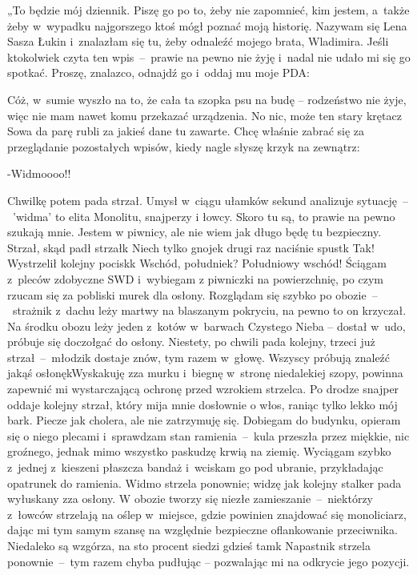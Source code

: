 \documentclass[../MAIN.tex]{subfiles}
\begin{document}
„To będzie mój dziennik. Piszę go po to, żeby nie zapomnieć,
kim jestem, a~także żeby w~wypadku najgorszego ktoś mógł poznać
moją historię. Nazywam się Lena Sasza Łukin i~znalazłam się tu,
żeby odnaleźć mojego brata, Wladimira. Jeśli ktokolwiek czyta
ten wpis~--~prawie na pewno nie żyję i~nadal nie udało mi się
go
spotkać. Proszę, znalazco, odnajdź go i~oddaj mu moje PDA:

Cóż, w~sumie wyszło na to, że cała ta szopka psu na budę –
rodzeństwo nie żyje, więc nie mam nawet komu przekazać
urządzenia. No nic, może ten stary krętacz Sowa da parę rubli
za jakieś dane tu zawarte. Chcę właśnie zabrać się za
przeglądanie pozostałych wpisów, kiedy nagle słyszę krzyk na
zewnątrz:

-Widmoooo!!

Chwilkę potem pada strzał. Umysł w~ciągu ułamków sekund
analizuje sytuację~--~'widma' to elita Monolitu, snajperzy i
łowcy. Skoro tu są, to prawie na pewno szukają mnie. Jestem w
piwnicy, ale nie wiem jak długo będę tu bezpieczny. Strzał,
skąd padł strzał\3k Niech tylko gnojek drugi raz naciśnie
spust\3k Tak! Wystrzelił kolejny pocisk\3k Wschód, południe\3k?
Południowy wschód! Ściągam z~pleców zdobyczne SWD i~wybiegam z
piwniczki na powierzchnię, po czym rzucam się za pobliski murek
dla osłony. Rozglądam się szybko po obozie~--~strażnik z~dachu
leży martwy na blaszanym pokryciu, na pewno to on krzyczał. Na
środku obozu leży jeden z~kotów w~barwach Czystego Nieba –
dostał w~udo, próbuje się doczołgać do osłony. Niestety, po
chwili pada kolejny, trzeci już strzał~--~młodzik dostaje znów,
tym razem w~głowę. Wszyscy próbują znaleźć jakąś
osłonę\3kWyskakuję zza murku i~biegnę w~stronę niedalekiej
szopy, powinna zapewnić mi wystarczającą ochronę przed wzrokiem
strzelca. Po drodze snajper oddaje kolejny strzał, który mija
mnie dosłownie o włos, raniąc tylko lekko mój bark. Piecze jak
cholera, ale nie zatrzymuję się. Dobiegam do budynku, opieram
się o niego plecami i~sprawdzam stan ramienia~--~kula przeszła
przez miękkie, nic groźnego, jednak mimo wszystko paskudzę
krwią na ziemię. Wyciągam szybko z~jednej z~kieszeni płaszcza
bandaż i~wciskam go pod ubranie, przykładając opatrunek do
ramienia. Widmo strzela ponownie; widzę jak kolejny stalker
pada wyłuskany zza osłony. W obozie tworzy się niezłe
zamieszanie~--~niektórzy z~łowców strzelają na oślep w~miejsce,
gdzie powinien znajdować się monoliciarz, dając mi tym samym
szansę na względnie bezpieczne oflankowanie przeciwnika.
Niedaleko są wzgórza, na sto procent siedzi gdzieś tam\3k
Napastnik strzela ponownie~--~tym razem chyba pudłując –
pozwalając mi na odkrycie jego pozycji.
\end{document}
